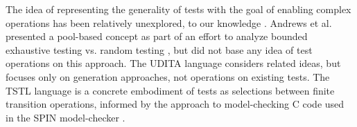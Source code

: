 The idea of representing the generality of tests with the goal of
enabling complex operations has been relatively unexplored, to our knowledge \cite{woda12}. Andrews et al. presented a
pool-based concept as part of an effort to analyze bounded exhaustive
testing vs. random testing \cite{AndrewsTR}, but did not base any idea
of test operations on this approach.  The UDITA language \cite{UDITA}
considers related ideas, but focuses only on generation approaches,
not operations on existing tests.  The TSTL language
\cite{NFM15,tstlsttt} is a concrete embodiment of tests as selections
between finite transition operations, informed by the approach to
model-checking C code used in the SPIN model-checker \cite{SPIN,ModelDriven,NewChall}.

